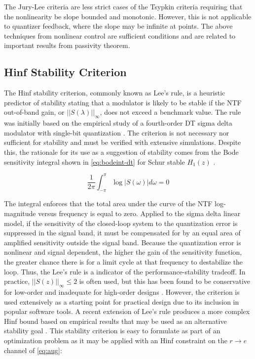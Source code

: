  The Jury-Lee criteria are less strict cases of the Tsypkin criteria requiring that the nonlinearity be slope bounded and monotonic. However, this is not applicable to quantizer feedback, where the slope may be infinite at points. The above techniques from nonlinear control are sufficient conditions and are related to important results from passivity theorem.
 
 \subsection{\gls{Hinf} Stability Criterion}
 \label{sec:stab-hinf}
 
The \gls{Hinf} stability criterion, commonly known as Lee's rule, is a heuristic predictor of stability stating that a modulator is likely to be stable if the \gls{NTF} out-of-band gain, or $||S(\lambda)||_\infty$, does not exceed a benchmark value. The rule was initially based on the empirical study of a fourth-order \gls{DT} sigma delta modulator with single-bit quantization \cite{Chao1990}. The criterion is not necessary nor sufficient for stability and must be verified with extensive simulations. Despite this, the rationale for its use as a suggestion of stability comes from the Bode sensitivity integral shown in \autoref{eq:bodeint-dt} for Schur stable $H_1(z)$ \cite[Thm. 1]{Zhao2015}.

\begin{equation} 
	\frac{1}{2\pi}\int_{-\pi}^{\pi} \log \left|S(\omega)\right|d\omega = 0 \label{eq:bodeint-dt}
\end{equation}

The integral enforces that the total area under the curve of the \gls{NTF} log-magnitude versus frequency is equal to zero. Applied to the sigma delta linear model, if the sensitivity of the closed-loop system to the quantization error is suppressed in the signal band, it must be compensated for by an equal area of amplified sensitivity outside the signal band. Because the quantization error is nonlinear and signal dependent, the higher the gain of the sensitivity function, the greater chance there is for a limit cycle at that frequency to destabilize the loop. Thus, the Lee's rule is a indicator of the performance-stability tradeoff. In practice, $||S(z)||_\infty \leq 2$ is often used, but this has been found to be conservative for low-order and inadequate for high-order designs \cite{Schreier1993}. However, the criterion is used extensively as a starting point for practical design due to its inclusion in popular software tools. A recent extension of Lee's rule produces a more complex \gls{Hinf} bound based on empirical results that may be used as an alternative stability goal \cite{Neitola2017}. This stability criterion is easy to formulate as part of an optimization problem as it may be applied with an \gls{Hinf} constraint on the $r \rightarrow e$ channel of \autoref{eq:aug}:

